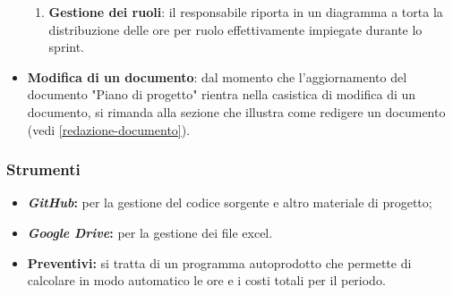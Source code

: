 \begin{itemize}
\begin{enumerate}
		      \item \textbf{Gestione dei ruoli}: il responsabile riporta in
		            un diagramma a torta la distribuzione delle ore per ruolo
		            effettivamente impiegate durante lo sprint.
	      \end{enumerate}

	\item \textbf{Modifica di un documento}: dal momento che
	      l'aggiornamento del documento "Piano di progetto" rientra nella
	      casistica di modifica di un documento, si rimanda alla sezione
	      che illustra come redigere un documento (vedi
	      \ref{redazione-documento}).
\end{itemize}

\subsubsection{Strumenti}
\begin{itemize}
	\item \textbf{\textit{GitHub\g}:} per la gestione del codice sorgente e altro
	      materiale di progetto;

	\item \textbf{\textit{Google Drive}:} per la gestione dei file excel.

	\item \textbf{Preventivi:} si tratta di un programma autoprodotto che
	      permette di calcolare in modo automatico le ore e i costi totali per
	      il periodo.
\end{itemize}
